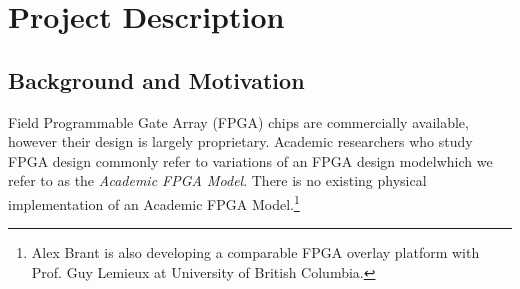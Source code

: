 \section{Project Description}

\subsection{Background and Motivation}

%
%
%

Field Programmable Gate Array (FPGA) chips are commercially available, however their design is largely proprietary.\citationneeded
Academic researchers who study FPGA design commonly refer to variations of an FPGA design model\citationneeded which we refer to as the \emph{Academic FPGA Model}.
There is no existing physical implementation of an Academic FPGA Model.\footnote{Alex Brant is also developing a comparable FPGA overlay platform with Prof. Guy Lemieux at University of British Columbia.}

